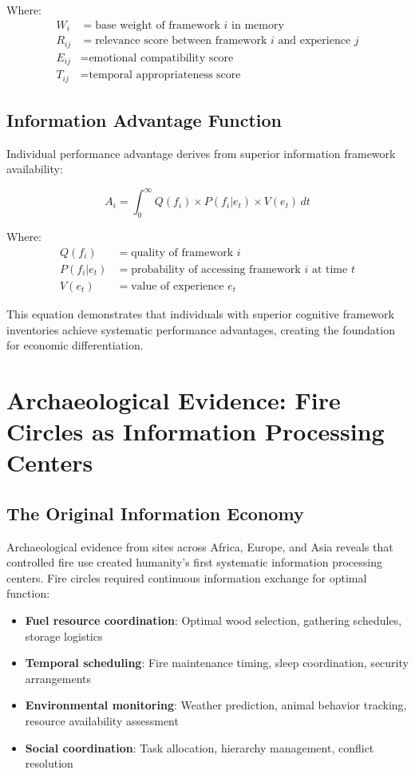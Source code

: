 \documentclass[12pt,a4paper]{article}
\begin{document}
Where:
\begin{align}
W_i &= \text{base weight of framework } i \text{ in memory} \\
R_{ij} &= \text{relevance score between framework } i \text{ and experience } j \\
E_{ij} &= \text{emotional compatibility score} \\
T_{ij} &= \text{temporal appropriateness score}
\end{align}

\subsection{Information Advantage Function}

Individual performance advantage derives from superior information framework availability:

\begin{equation}
A_i = \int_{0}^{\infty} Q(f_i) \times P(f_i | e_t) \times V(e_t) \, dt
\end{equation}

Where:
\begin{align}
Q(f_i) &= \text{quality of framework } i \\
P(f_i | e_t) &= \text{probability of accessing framework } i \text{ at time } t \\
V(e_t) &= \text{value of experience } e_t
\end{align}

This equation demonstrates that individuals with superior cognitive framework inventories achieve systematic performance advantages, creating the foundation for economic differentiation.

\section{Archaeological Evidence: Fire Circles as Information Processing Centers}

\subsection{The Original Information Economy}

Archaeological evidence from sites across Africa, Europe, and Asia reveals that controlled fire use created humanity's first systematic information processing centers. Fire circles required continuous information exchange for optimal function:

\begin{itemize}
\item \textbf{Fuel resource coordination}: Optimal wood selection, gathering schedules, storage logistics
\item \textbf{Temporal scheduling}: Fire maintenance timing, sleep coordination, security arrangements  
\item \textbf{Environmental monitoring}: Weather prediction, animal behavior tracking, resource availability assessment
\item \textbf{Social coordination}: Task allocation, hierarchy management, conflict resolution
\end{itemize}
\end{document}
